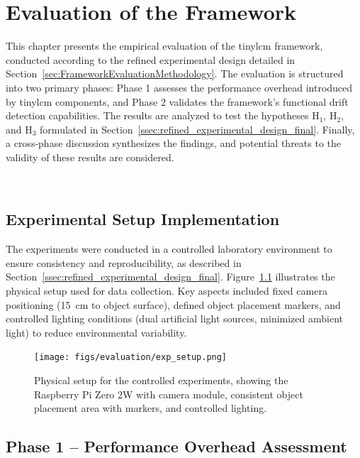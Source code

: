 
\chapter{Evaluation of the Framework}
\label{chp:Evaluation}

This chapter presents the empirical evaluation of the \gls{tinylcm} framework, conducted according to the refined experimental design detailed in Section~\ref{sec:FrameworkEvaluationMethodology}. The evaluation is structured into two primary phases: Phase 1 assesses the performance overhead introduced by \gls{tinylcm} components, and Phase 2 validates the framework's functional drift detection capabilities. The results are analyzed to test the hypotheses H$_1$, H$_2$, and H$_3$ formulated in Section~\ref{ssec:refined_experimental_design_final}. Finally, a cross-phase discussion synthesizes the findings, and potential threats to the validity of these results are considered.

~\\
\vfill
\minitoc
\clearpage

\section{Experimental Setup Implementation}
\label{sec:exper-setup_implementation}

The experiments were conducted in a controlled laboratory environment to ensure consistency and reproducibility, as described in Section~\ref{ssec:refined_experimental_design_final}. Figure~\ref{fig:exp_setup_photo} illustrates the physical setup used for data collection. Key aspects included fixed camera positioning (\SI{15}{\centi\meter} to object surface), defined object placement markers, and controlled lighting conditions (dual artificial light sources, minimized ambient light) to reduce environmental variability.

\begin{figure}[htbp]
  \centering
  \texttt{[image: figs/evaluation/exp\_setup.png]}
  \caption[Photograph of the Controlled Experimental Setup]{Physical setup for the controlled experiments, showing the Raspberry Pi Zero 2W with camera module, consistent object placement area with markers, and controlled lighting.}
  \label{fig:exp_setup_photo}
\end{figure}

\section{Phase 1 – Performance Overhead Assessment}
\label{sec:phase1_results_overhead}

